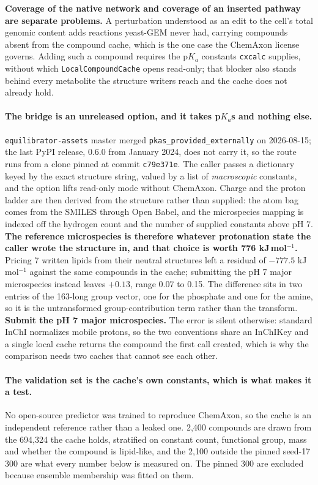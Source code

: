 \textbf{Coverage of the native network and coverage of an inserted pathway are separate
problems.} A perturbation understood as an edit to the cell's total genomic content adds
reactions yeast-GEM never had, carrying compounds absent from the compound cache, which is
the one case the ChemAxon license governs. Adding such a compound requires the p$K_a$
constants \texttt{cxcalc} supplies, without which \texttt{LocalCompoundCache} opens
read-only; that blocker also stands behind every metabolite the structure writers reach and
the cache does not already hold.

\paragraph{The bridge is an unreleased option, and it takes p$K_a$s and nothing else.}
\texttt{equilibrator-assets} master merged \texttt{pkas\_provided\_externally} on
2026-08-15; the last PyPI release, 0.6.0 from January 2024, does not carry it, so the route
runs from a clone pinned at commit \texttt{c79e371e}. The caller passes a dictionary keyed
by the exact structure string, valued by a list of \emph{macroscopic} constants, and the
option lifts read-only mode without ChemAxon. Charge and the proton ladder are then derived
from the structure rather than supplied: the atom bag comes from the SMILES through Open
Babel, and the microspecies mapping is indexed off the hydrogen count and the number of
supplied constants above pH 7. \textbf{The reference microspecies is therefore whatever
protonation state the caller wrote the structure in, and that choice is worth
776 kJ\,mol$^{-1}$.} Pricing 7 written lipids from their neutral structures left a residual
of $-777.5$ kJ\,mol$^{-1}$ against the same compounds in the cache; submitting the pH 7
major microspecies instead leaves $+0.13$, range 0.07 to 0.15. The difference sits in two
entries of the 163-long group vector, one for the phosphate and one for the amine, so it is
the untransformed group-contribution term rather than the transform. \textbf{Submit the
pH 7 major microspecies.} The error is silent otherwise: standard InChI normalizes mobile
protons, so the two conventions share an InChIKey and a single local cache returns the
compound the first call created, which is why the comparison needs two caches that cannot
see each other.

\paragraph{The validation set is the cache's own constants, which is what makes it a test.}
No open-source predictor was trained to reproduce ChemAxon, so the cache is an independent
reference rather than a leaked one. 2{,}400 compounds are drawn from the 694{,}324 the cache
holds, stratified on constant count, functional group, mass and whether the compound is
lipid-like, and the 2{,}100 outside the pinned seed-17 300 are what every number below is
measured on. The pinned 300 are excluded because ensemble membership was fitted on them.

